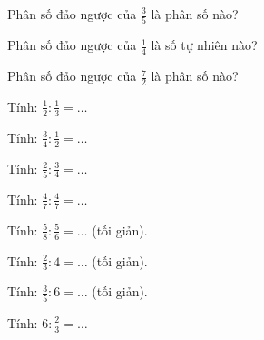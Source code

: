 \begin{ex}
Phân số đảo ngược của $\frac{3}{5}$ là phân số nào?
\end{ex}

\begin{ex}
Phân số đảo ngược của $\frac{1}{4}$ là số tự nhiên nào?
\end{ex}

\begin{ex}
Phân số đảo ngược của $\frac{7}{2}$ là phân số nào?
\end{ex}

\begin{ex}
Tính: $\frac{1}{2} : \frac{1}{3} = \dots$
\end{ex}

\begin{ex}
Tính: $\frac{3}{4} : \frac{1}{2} = \dots$
\end{ex}

\begin{ex}
Tính: $\frac{2}{5} : \frac{3}{4} = \dots$
\end{ex}

\begin{ex}
Tính: $\frac{4}{7} : \frac{4}{7} = \dots$
\end{ex}

\begin{ex}
Tính: $\frac{5}{8} : \frac{5}{6} = \dots$ (tối giản).
\end{ex}

\begin{ex}
Tính: $\frac{2}{3} : 4 = \dots$ (tối giản).
\end{ex}

\begin{ex}
Tính: $\frac{3}{5} : 6 = \dots$ (tối giản).
\end{ex}

\begin{ex}
Tính: $6 : \frac{2}{3} = \dots$
\end{ex}

